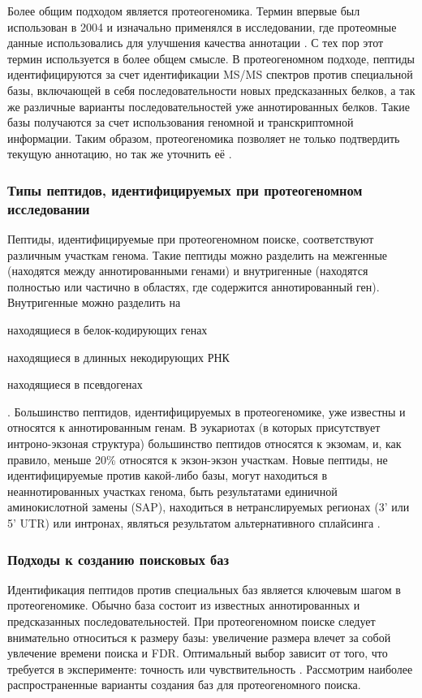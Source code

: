 Более общим подходом является протеогеномика. Термин впервые был использован в 2004 и изначально применялся в исследовании, где протеомные данные использовались для улучшения качества аннотации \cite{jaffe2004proteogenomic}. С тех пор этот термин используется в более общем смысле. В протеогеномном подходе, пептиды идентифицируются за счет идентификации MS/MS спектров против специальной базы, включающей в себя последовательности новых предсказанных белков, а так же различные варианты последовательностей уже аннотированных белков. Такие базы получаются за счет использования геномной и транскриптомной информации. Таким образом, протеогеномика позволяет не только подтвердить текущую аннотацию, но так же уточнить её \cite{nesvizhskii2014proteogenomics}. 

\subsubsection{Типы пептидов, идентифицируемых при протеогеномном исследовании}
Пептиды, идентифицируемые при протеогеномном поиске, соответствуют различным участкам генома. Такие пептиды можно разделить на межгенные (находятся между аннотированными генами) и внутригенные (находятся полностью или частично в областях, где содержится аннотированный ген). Внутригенные можно разделить на 
\begin{inparaenum}
    \item находящиеся в белок-кодирующих генах 
    \item находящиеся в длинных некодирующих РНК
    \item находящиеся в псевдогенах
\end{inparaenum} \cite{harrow2012gencode}. Большинство пептидов, идентифицируемых в протеогеномике, уже известны и относятся к аннотированным генам. В эукариотах (в которых присутствует интроно-экзоная структура) большинство пептидов относятся к экзомам, и, как правило, меньше 20\% относятся к экзон-экзон участкам. Новые пептиды, не идентифицируемые против какой-либо базы, могут находиться в неаннотированных участках генома, быть результатами единичной аминокислотной замены (SAP), находиться в нетранслируемых регионах (3' или 5' UTR) или интронах, являться результатом альтернативного сплайсинга \cite{nesvizhskii2014proteogenomics}.

\subsubsection{Подходы к созданию поисковых баз}
Идентификация пептидов против специальных баз является ключевым шагом в протеогеномике. Обычно база состоит из известных аннотированных и предсказанных последовательностей. При протеогеномном поиске следует внимательно относиться к размеру базы: увеличение размера влечет за собой увлечение времени поиска и FDR. Оптимальный выбор зависит от того, что требуется в эксперименте: точность или чувствительность \cite{nesvizhskii2014proteogenomics}. Рассмотрим наиболее распространенные варианты создания баз для протеогеномного поиска.

